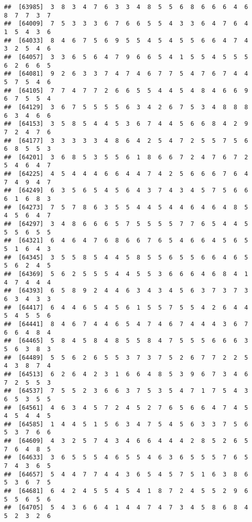 \documentclass[
]{book}
\begin{document}
\begin{verbatim}
##  [63985]  3  8  3  4  7  6  3  3  4  8  5  5  6  8  6  6  6  4  6  8  7  7  3  7
##  [64009]  7  5  3  3  3  6  7  6  6  5  5  4  3  3  6  4  7  6  4  1  5  4  3  6
##  [64033]  8  4  6  7  5  6  9  5  5  4  5  4  5  5  6  6  4  7  4  3  2  5  4  6
##  [64057]  3  3  6  5  6  4  7  9  6  6  5  4  1  5  5  4  5  5  5  6  2  6  6  5
##  [64081]  9  2  6  3  3  7  4  7  4  6  7  7  5  4  7  6  7  4  4  5  7  5  4  6
##  [64105]  7  7  4  7  7  2  6  6  5  5  4  4  5  4  8  4  6  6  9  6  7  5  5  4
##  [64129]  3  6  7  5  5  5  5  6  3  4  2  6  7  5  3  4  8  8  8  6  3  4  6  6
##  [64153]  3  5  8  5  4  4  5  3  6  7  4  4  5  6  6  8  4  2  9  7  2  4  7  6
##  [64177]  3  3  3  3  3  4  8  6  4  2  5  4  7  2  5  5  7  5  6  6  8  5  5  3
##  [64201]  3  6  8  5  3  5  5  6  1  8  6  6  7  2  4  7  6  7  2  5  4  6  4  7
##  [64225]  4  5  4  4  4  6  6  4  4  7  4  2  5  6  6  6  7  6  4  7  4  9  4  7
##  [64249]  6  3  5  6  5  4  5  6  4  3  7  4  3  4  5  7  5  6  6  6  1  6  8  3
##  [64273]  7  5  7  8  6  3  5  5  4  4  5  4  4  6  4  6  4  8  5  4  5  6  4  7
##  [64297]  3  4  8  6  6  6  5  7  5  5  5  5  7  7  6  5  4  4  5  5  5  6  5  5
##  [64321]  6  4  6  4  7  6  8  6  6  7  6  5  4  6  6  4  5  6  5  5  1  6  4  3
##  [64345]  3  5  5  8  5  4  4  5  8  5  5  6  5  5  6  6  4  6  5  5  6  2  4  5
##  [64369]  5  6  2  5  5  5  4  4  5  5  3  6  6  6  4  6  8  4  1  4  7  4  4  4
##  [64393]  6  5  8  9  2  4  4  6  3  4  3  4  5  6  3  7  3  7  3  6  3  4  3  3
##  [64417]  6  4  4  6  5  4  5  6  1  5  5  7  5  5  4  2  6  4  4  5  4  5  5  6
##  [64441]  8  4  6  7  4  4  6  5  4  7  4  6  7  4  4  4  3  6  7  6  6  4  8  4
##  [64465]  5  8  4  5  8  4  8  5  5  8  4  7  5  5  5  6  6  6  3  5  6  3  8  3
##  [64489]  5  5  6  2  6  5  5  3  7  3  7  5  2  6  7  7  2  2  5  4  3  8  7  4
##  [64513]  6  2  6  4  2  3  1  6  6  4  8  5  3  9  6  7  3  4  6  7  2  5  5  3
##  [64537]  7  5  5  2  3  6  6  3  7  5  3  5  4  7  1  7  5  4  3  6  5  3  5  5
##  [64561]  4  6  3  4  5  7  2  4  5  2  7  6  5  6  6  4  7  4  5  4  5  4  4  5
##  [64585]  1  4  4  5  1  5  6  3  4  7  5  4  5  6  3  3  7  5  6  5  3  7  6  6
##  [64609]  4  3  2  5  7  4  3  4  6  6  4  4  4  2  8  5  2  6  5  7  6  4  8  5
##  [64633]  3  6  5  5  5  4  6  5  5  4  6  3  6  5  5  5  7  6  5  7  4  3  6  5
##  [64657]  5  4  4  7  7  4  4  3  6  5  4  5  7  5  1  6  3  8  6  5  3  6  7  5
##  [64681]  6  4  2  4  5  5  4  5  4  1  8  7  2  4  5  5  2  9  6  5  5  6  5  6
##  [64705]  5  4  3  6  6  4  1  4  4  7  4  7  3  4  5  8  6  8  4  5  2  3  2  6

\end{verbatim}
\end{document}
